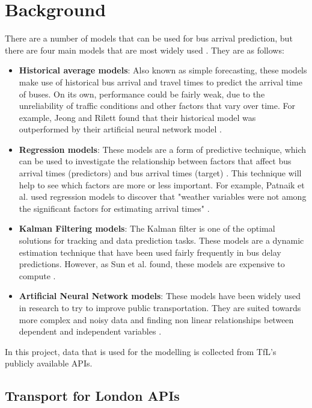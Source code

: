 \section{Background}

There are a number of models that can be used for bus arrival prediction, but there are four main models that are most widely used \cite{dynamic-gps}. They are as follows: 
\begin{itemize}
    \item \textbf{Historical average models}: Also known as simple forecasting, these models make use of historical bus arrival and travel times to predict the arrival time of buses. On its own, performance could be fairly weak, due to the unreliability of traffic conditions and other factors that vary over time. For example, Jeong and Rilett found that their historical model was outperformed by their artificial neural network model \cite{ann-prediction}.
    \item \textbf{Regression models}: These models are a form of predictive technique, which can be used to investigate the relationship between factors that affect bus arrival times (predictors) and bus arrival times (target) \cite{regression-techniques}. This technique will help to see which factors are more or less important. For example, Patnaik et al. used regression models to discover that "weather variables were not among the significant factors for estimating arrival times" \cite{apc-estimation}. 
    \item \textbf{Kalman Filtering models}: The Kalman filter is one of the optimal solutions for tracking and data prediction tasks. These models are a dynamic estimation technique that have been used fairly frequently in bus delay predictions. However, as Sun et al. found, these models are expensive to compute \cite{smart-public-transport}.
    \item \textbf{Artificial Neural Network models}: These models have been widely used in research to try to improve public transportation. They are suited towards more complex and noisy data and finding non linear relationships between dependent and independent variables \cite{dynamic-gps}. 
\end{itemize}

In this project, data that is used for the modelling is collected from TfL's publicly available APIs.

\subsection{Transport for London APIs}
\label{section:tfl-api}

